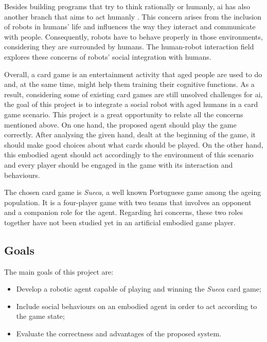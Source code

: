 Besides building programs that try to think rationally or humanly, \gls{ai} has also another branch that aims to act humanly \cite{Russell2009}.
This concern arises from the inclusion of robots in humans' life and influences the way they interact  and communicate with people.
Consequently, robots have to behave properly in those environments, considering they are surrounded by humans.
The human-robot interaction field explores these concerns of robots' social integration with humans.




Overall, a card game is an entertainment activity that aged people are used to do and, at the same time, might help them training their cognitive functions.
As a result, considering some of existing card games are still unsolved challenges for \gls{ai}, the goal of this project is to integrate a social robot with aged humans in a card game scenario.
This project is a great opportunity to relate all the concerns mentioned above.
On one hand, the proposed agent should play the game correctly.
After analysing the given hand, dealt at the beginning of the game, it should make good choices about what cards should be played.
On the other hand, this embodied agent should act accordingly to the environment of this scenario and every player should be engaged in the game with its interaction and behaviours.


The chosen card game is \emph{Sueca}, a well known Portuguese game among the ageing population.
It is a four-player game with two teams that involves an opponent and a companion role for the agent.
Regarding \gls{hri} concerns, these two roles together have not been studied yet in an artificial embodied game player.



\subsection{Goals}
\label{sec:goals}

The main goals of this project are:
\begin{itemize}
\item Develop a robotic agent capable of playing and winning the \emph{Sueca} card game;
\item Include social behaviours on an embodied agent in order to act according to the game state;
\item Evaluate the correctness and advantages of the proposed system.
\end{itemize}

